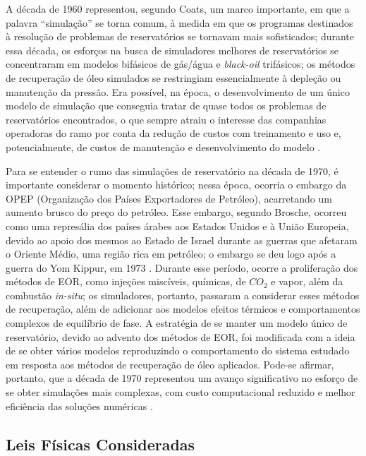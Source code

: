 A década de 1960 representou, segundo Coats, um marco importante, em que a palavra ``simulação'' se torna comum, à medida em que os programas destinados à resolução de problemas de reservatórios se tornavam mais sofisticados; durante essa década, os esforços na busca de simuladores melhores de reservatórios se concentraram em modelos bifásicos de gás/água e \textit{black-oil} trifásicos; os métodos de recuperação de óleo simulados se restringiam essencialmente à depleção ou manutenção da pressão. Era possível, na época, o desenvolvimento de um único modelo de simulação que conseguia tratar de quase todos os problemas de reservatórios encontrados, o que sempre atraiu o interesse das companhias operadoras do ramo por conta da redução de custos com treinamento e uso e, potencialmente, de custos de manutenção e desenvolvimento do modelo \cite{coats1982}.

Para se entender o rumo das simulações de reservatório na década de 1970, é importante considerar o momento histórico; nessa época, ocorria o embargo da OPEP (Organização dos Países Exportadores de Petróleo), acarretando um aumento brusco do preço do petróleo. Esse embargo, segundo Brosche, ocorreu como uma represália dos países árabes aos Estados Unidos e à União Europeia, devido ao apoio dos mesmos ao Estado de Israel durante as guerras que afetaram o Oriente Médio, uma região rica em petróleo; o embargo se deu logo após a guerra do Yom Kippur, em 1973 \cite{brosche1974}. Durante esse período, ocorre a proliferação dos métodos de EOR, como injeções miscíveis, químicas, de $CO_2$ e vapor, além da combustão \textit{in-situ}; os simuladores, portanto, passaram a considerar esses métodos de recuperação, além de adicionar aos modelos efeitos térmicos e comportamentos complexos de equilíbrio de fase. A estratégia de se manter um modelo único de reservatório, devido ao advento dos métodos de EOR, foi modificada com a ideia de se obter vários modelos reproduzindo o comportamento do sistema estudado em resposta aos métodos de recuperação de óleo aplicados. Pode-se afirmar, portanto, que a década de 1970 representou um avanço significativo no esforço de se obter simulações mais complexas, com custo computacional reduzido e melhor eficiência das soluções numéricas \cite{coats1982}.




\subsection{Leis F\'{i}sicas Consideradas}

